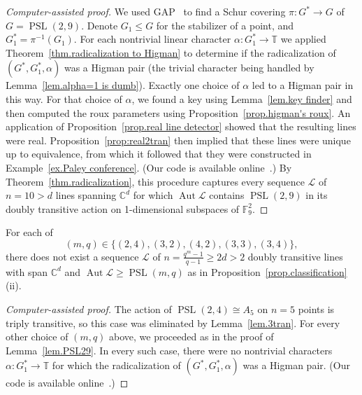 \begin{proof}[Computer-assisted proof]
We used GAP~\cite{GAP} to find a Schur covering $\pi \colon G^* \to G$ of $G=\operatorname{PSL}(2,9)$.
Denote $G_1 \leq G$ for the stabilizer of a point, and $G_1^* = \pi^{-1}(G_1)$.
For each nontrivial linear character $\alpha \colon G_1^* \to \mathbb{T}$ we applied Theorem~\ref{thm.radicalization to Higman} to determine if the radicalization of $(G^*,G_1^*,\alpha)$ was a Higman pair (the trivial character being handled by Lemma~\ref{lem.alpha=1 is dumb}).
Exactly one choice of $\alpha$ led to a Higman pair in this way.
For that choice of $\alpha$, we found a key using Lemma~\ref{lem.key finder} and then computed the roux parameters using Proposition~\ref{prop.higman's roux}.
An application of Proposition~\ref{prop.real line detector} showed that the resulting lines were real.
Proposition~\ref{prop:real2tran} then implied that these lines were unique up to equivalence, from which it followed that they were constructed in Example~\ref{ex.Paley conference}.
(Our code is available online~\cite{github}.)
By Theorem~\ref{thm.radicalization}, this procedure captures every sequence $\mathscr{L}$ of $n=10 > d$ lines spanning $\mathbb{C}^d$ for which $\operatorname{Aut} \mathscr{L}$ contains $\operatorname{PSL}(2,9)$ in its doubly transitive action on 1-dimensional subspaces of $\mathbb{F}_9^2$.
\end{proof}

\begin{lemma}
\label{lem.PSL weirdos}
For each of
\[
(m,q)\in\{(2,4),(3,2),(4,2),(3,3),(3,4)\},
\]
there does not exist a sequence $\mathscr{L}$ of $n = \frac{q^m-1}{q-1} \geq 2d > 2$ doubly transitive lines with span $\mathbb{C}^d$ and $\operatorname{Aut} \mathscr{L} \geq\operatorname{PSL}(m,q)$ as in Proposition~\ref{prop.classification}(ii).
\end{lemma}

\begin{proof}[Computer-assisted proof]
The action of $\operatorname{PSL}(2,4)\cong A_5$ on $n=5$ points is triply transitive, so this case was eliminated by Lemma~\ref{lem.3tran}.
For every other choice of $(m,q)$ above, we proceeded as in the proof of Lemma~\ref{lem.PSL29}.
In every such case, there were no nontrivial characters $\alpha \colon G_1^* \to \mathbb{T}$ for which the radicalization of $(G^*,G_1^*,\alpha)$ was a Higman pair.
(Our code is available online~\cite{github}.)
\end{proof}

